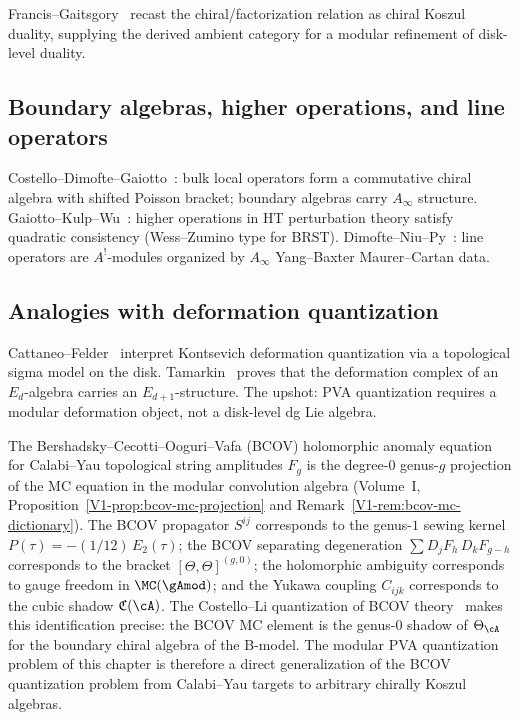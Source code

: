 Francis--Gaitsgory~\cite{FG12} recast the chiral/factorization relation as chiral Koszul duality, supplying the derived ambient category for a modular refinement of disk-level duality.

\subsection{Boundary algebras, higher operations, and line operators}

Costello--Dimofte--Gaiotto~\cite{CDG20}: bulk local operators form a commutative chiral algebra with shifted Poisson bracket; boundary algebras carry $A_\infty$ structure. Gaiotto--Kulp--Wu~\cite{GKW25}: higher operations in HT perturbation theory satisfy quadratic consistency (Wess--Zumino type for BRST). Dimofte--Niu--Py~\cite{DNP25}: line operators are $A^!$-modules organized by $A_\infty$ Yang--Baxter Maurer--Cartan data.

\subsection{Analogies with deformation quantization}

Cattaneo--Felder~\cite{CF00} interpret Kontsevich deformation quantization via a topological sigma model on the disk. Tamarkin~\cite{Tam02} proves that the deformation complex of an $E_d$-algebra carries an $E_{d+1}$-structure. The upshot: PVA quantization requires a modular deformation object, not a disk-level dg Lie algebra.

\begin{remark}
\label{rem:bcov-mc-pva}
The Bershadsky--Cecotti--Ooguri--Vafa (BCOV) holomorphic anomaly
equation for Calabi--Yau topological string amplitudes $F_g$ is
the degree-$0$ genus-$g$ projection of the MC equation in
the modular convolution algebra
(Volume~I, Proposition~\ref{V1-prop:bcov-mc-projection} and
Remark~\ref{V1-rem:bcov-mc-dictionary}).
The BCOV propagator $S^{ij}$ corresponds to the genus-$1$
sewing kernel $P(\tau) = -(1/12)\,E_2(\tau)$;
the BCOV separating degeneration
$\sum D_j F_h\,D_k F_{g-h}$ corresponds to the bracket
$[\Theta,\Theta]^{(g,0)}$;
the holomorphic ambiguity corresponds to gauge freedom in
$\MC(\gAmod)$; and the Yukawa coupling $C_{ijk}$ corresponds
to the cubic shadow $\mathfrak{C}(\cA)$.
The Costello--Li quantization of BCOV theory~\cite{Costello-1705.02500v1}
makes this identification precise: the BCOV MC element is the
genus-$0$ shadow of $\Theta_\cA$ for the boundary chiral algebra
of the B-model.
The modular PVA quantization problem of this chapter is therefore
a direct generalization of the BCOV quantization problem from
Calabi--Yau targets to arbitrary chirally Koszul algebras.
\end{remark}

